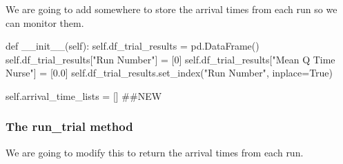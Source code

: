 \documentclass[
  letterpaper,
  DIV=11,
  numbers=noendperiod]{scrreprt}
\newenvironment{Shaded}{\begin{snugshade}}{\end{snugshade}}
\newcommand{\CommentTok}[1]{\textcolor[rgb]{0.37,0.37,0.37}{#1}}
\newcommand{\DecValTok}[1]{\textcolor[rgb]{0.68,0.00,0.00}{#1}}
\newcommand{\FloatTok}[1]{\textcolor[rgb]{0.68,0.00,0.00}{#1}}
\newcommand{\FunctionTok}[1]{\textcolor[rgb]{0.28,0.35,0.67}{#1}}
\newcommand{\KeywordTok}[1]{\textcolor[rgb]{0.00,0.23,0.31}{#1}}
\newcommand{\NormalTok}[1]{\textcolor[rgb]{0.00,0.23,0.31}{#1}}
\newcommand{\OperatorTok}[1]{\textcolor[rgb]{0.37,0.37,0.37}{#1}}
\newcommand{\StringTok}[1]{\textcolor[rgb]{0.13,0.47,0.30}{#1}}
\newcommand{\VariableTok}[1]{\textcolor[rgb]{0.07,0.07,0.07}{#1}}
\begin{document}
We are going to add somewhere to store the arrival times from each run
so we can monitor them.

\begin{Shaded}
\begin{Highlighting}[]
\KeywordTok{def}  \FunctionTok{\_\_init\_\_}\NormalTok{(}\VariableTok{self}\NormalTok{):}
    \VariableTok{self}\NormalTok{.df\_trial\_results }\OperatorTok{=}\NormalTok{ pd.DataFrame()}
    \VariableTok{self}\NormalTok{.df\_trial\_results[}\StringTok{"Run Number"}\NormalTok{] }\OperatorTok{=}\NormalTok{ [}\DecValTok{0}\NormalTok{]}
    \VariableTok{self}\NormalTok{.df\_trial\_results[}\StringTok{"Mean Q Time Nurse"}\NormalTok{] }\OperatorTok{=}\NormalTok{ [}\FloatTok{0.0}\NormalTok{]}
    \VariableTok{self}\NormalTok{.df\_trial\_results.set\_index(}\StringTok{"Run Number"}\NormalTok{, inplace}\OperatorTok{=}\VariableTok{True}\NormalTok{)}

    \VariableTok{self}\NormalTok{.arrival\_time\_lists }\OperatorTok{=}\NormalTok{ [] }\CommentTok{\#\#NEW}
\end{Highlighting}
\end{Shaded}

\subsubsection{The run\_trial method}\label{the-run_trial-method-3}

We are going to modify this to return the arrival times from each run.
\end{document}
